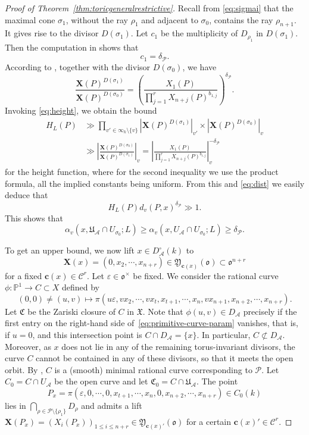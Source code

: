\documentclass[a4paper, twoside, 11pt]{amsart}
\theoremstyle{definition}
\newcommand{\cA}{\mathcal{A}}
\newcommand{\cC}{\mathcal{C}}
\newcommand{\cP}{\mathcal{P}}
\newcommand{\bc}{\boldsymbol{c}}
\newcommand{\bX}{{\boldsymbol{X}}}
\newcommand{\mC}{\mathfrak{C}}
\newcommand{\mU}{\mathfrak{U}}
\newcommand{\mX}{\mathfrak{X}}
\newcommand{\mY}{\mathfrak{Y}}
\newcommand{\fo}{\mathfrak{o}}
\newcommand{\PP}{\mathbb{P}}
\begin{document}
\begin{proof}[Proof of Theorem~\ref{thm:toricgeneralrestrictive}]
Recall from \eqref{eq:sigmai} that the maximal cone $\sigma_1$, without the ray $\rho_1$ and adjacent to $\sigma_0$, contains the ray $\rho_{n+1}$. It gives rise to the divisor $D(\sigma_1)$. Let $c_1$ be the multiplicity of $D_{\rho_1}$ in $D(\sigma_1)$. Then the computation in \cite[(54)]{HuangANT} shows that $$c_1=\delta_\cP.$$  According to \cite[Lem.~8.9, Rem.~11.23]{Salberger}, together with the divisor $D(\sigma_0)$, we have $$\frac{\bX(P)^{D(\sigma_1)}}{\bX(P)^{D(\sigma_0)}}=\left(\frac{X_1(P)}{\prod_{j=1}^{r}X_{n+j}(P)^{{b}_{1,j}}}\right)^{\delta_{\cP}}.$$ Invoking \eqref{eq:height}, we obtain the bound 
\begin{equation}\label{eq:case1}
    \begin{split}
        H_L(P)&\gg \prod_{v'\in\infty_k\setminus\{v\}}\left|\bX(P)^{D(\sigma_1)}\right|_{v'}\times \left|\bX(P)^{D(\sigma_0)}\right|_{v}\\ &\gg \left|\frac{\bX(P)^{D(\sigma_0)}}{\bX(P)^{D(\sigma_1)}}\right|_{v}=\left|\frac{X_1(P)}{\prod_{j=1}^{r}X_{n+j}(P)^{{b}_{1,j}}}\right|_{v}^{-\delta_{\cP}}
    \end{split} 
\end{equation}
for the height function, where for the second inequality we use the product formula, all the implied constants being uniform. From this and \eqref{eq:dist} we easily deduce that $$H_L(P)d_v(P,x)^{\delta_\cP}\gg 1.$$  This shows that $$\alpha_v(x,\mU_{\cA}\cap U_{\sigma_0};L)\geq \alpha_v(x,U_{\cA}\cap U_{\sigma_0};L)\geq \delta_\cP.$$


 To get an upper bound, we now lift $x\in D_{\cA}^{\circ}(k)$ to
 \begin{equation*}
	\bX(x)=(0,x_2,\cdots,x_{n+r})
    \in\mY_{\bc(x)}(\fo)\subset \fo^{n+r}
 \end{equation*}
 	for a fixed $\bc(x)\in \cC^r$. 
    Let $\varepsilon\in \fo^\times$ be fixed. We consider the rational curve $\phi\colon \PP^1\to C\subset X$ defined by 
    \begin{equation}\label{eq:primitive-curve-param}
        (0,0)\neq(u,v)\mapsto \pi(u\varepsilon,vx_2,\cdots,vx_t,x_{t+1},\cdots,x_n,vx_{n+1},x_{n+2},\cdots,x_{n+r}).
    \end{equation}
    Let $\mC$ be the Zariski closure of $C$ in $\mX$.
Note that $\phi(u,v)\in D_\cA$ precisely if the first entry on the right-hand side of~\eqref{eq:primitive-curve-param} vanishes, that is, if $u=0$, and this intersection point is $C\cap D_\cA = \{x\}$. In particular, $C\not\subset D_{\cA}$. Moreover, as $x$ does not lie in any of the remaining torus-invariant divisors, the curve $C$ cannot be contained in any of these divisors, so that it meets the open orbit.  By \cite[Thm.~2.2]{HuangANT}, $C$ is a (smooth) minimal rational curve
corresponding to $\cP$.
Let $C_0=C\cap U_{\cA}$ be the open curve and let $\mC_0=C\cap\mU_{\cA}$.
The point $$P_x=\pi(\varepsilon,0,\cdots,0,x_{t+1},\cdots,x_n,0,x_{n+2},\cdots,x_{n+r})\in C_0(k)$$ lies in  $\bigcap_{\rho\in\cP\setminus\{\rho_1\}}D_{\rho}$ and admits a lift $\bX(P_x)=(X_i(P_x))_{1\leq i\leq n+r}\in \mY_{\bc(x)'}(\fo)$ for a certain $\bc(x)'\in\cC^r$. 


\end{proof}
\end{document}
